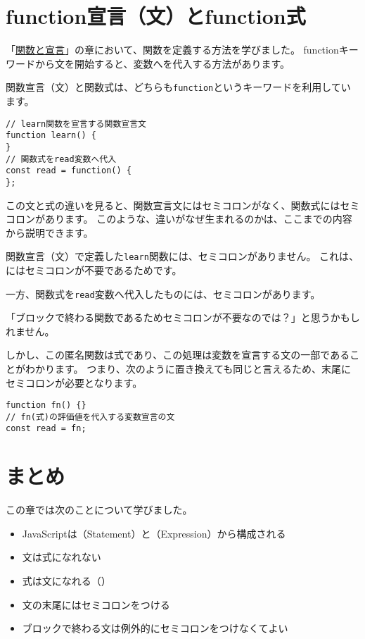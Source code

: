 \hypertarget{function-statement-and-function-expression}{%
\section{function宣言（文）とfunction式}\label{function-statement-and-function-expression}}

「\hyperlink{function-and-declaration}{関数と宣言}」の章において、関数を定義する方法を学びました。
functionキーワードから文を開始すると、変数へを代入する方法があります。

関数宣言（文）と関数式は、どちらも\texttt{function}というキーワードを利用しています。

\begin{lstlisting}
// learn関数を宣言する関数宣言文
function learn() {
}
// 関数式をread変数へ代入
const read = function() {
};
\end{lstlisting}

この文と式の違いを見ると、関数宣言文にはセミコロンがなく、関数式にはセミコロンがあります。
このような、違いがなぜ生まれるのかは、ここまでの内容から説明できます。

関数宣言（文）で定義した\texttt{learn}関数には、セミコロンがありません。
これは、にはセミコロンが不要であるためです。

一方、関数式を\texttt{read}変数へ代入したものには、セミコロンがあります。

「ブロックで終わる関数であるためセミコロンが不要なのでは？」と思うかもしれません。

しかし、この匿名関数は式であり、この処理は変数を宣言する文の一部であることがわかります。
つまり、次のように置き換えても同じと言えるため、末尾にセミコロンが必要となります。

\begin{lstlisting}
function fn() {}
// fn(式)の評価値を代入する変数宣言の文
const read = fn;
\end{lstlisting}

\hypertarget{statement-expression-summary}{%
\section{まとめ}\label{statement-expression-summary}}

この章では次のことについて学びました。

\begin{itemize}
\item
  JavaScriptは（Statement）と（Expression）から構成される
\item
  文は式になれない
\item
  式は文になれる（）
\item
  文の末尾にはセミコロンをつける
\item
  ブロックで終わる文は例外的にセミコロンをつけなくてよい
\end{itemize}


